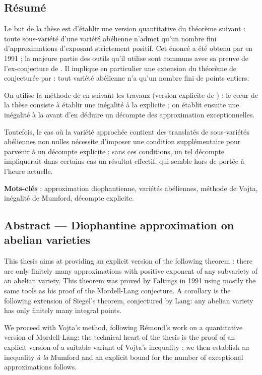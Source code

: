\documentclass[final, cover]{mpg-preth}
\begin{document}
\thispagestyle{empty}

\subsection*{Résumé}

Le but de la thèse est d'établir une version quantitative du théorème suivant
: toute sous-variété d'une variété abélienne n'admet qu'un nombre fini
d'approximations d'exposant strictement positif. Cet énoncé a été obtenu par
 en 1991 ; la majeure partie des outils qu'il utilise sont
communs avec sa preuve de l'ex-conjecture de . Il implique
en particulier une extension du théorème de  conjecturée par
 : tout variété abélienne n'a qu'un nombre fini de points entiers.

On utilise la méthode de  en suivant les travaux 
(version explicite de ) : le cœur de la thèse consiste à
établir une inégalité à la  explicite ; on établit ensuite une
inégalité à la  avant d'en déduire un décompte des approximation
exceptionnelles.

Toutefois, le cas où la variété approchée contient des translatés de
sous-variétés abéliennes non nulles nécessite d'imposer une condition
supplémentaire pour parvenir à un décompte explicite : sans ces conditions,
un tel décompte impliquerait dans certains cas un résultat effectif, qui
semble hors de portée à l'heure actuelle.

\medskip\noindent
\textbf{Mots-clés} : approximation diophantienne, variétés abéliennes, méthode
de Vojta, inégalité de Mumford, décompte explicite.

\subsection*{Abstract --- Diophantine approximation on abelian varieties}

This thesis aims at providing an explicit version of the following theorem :
there are only finitely many approximations with positive exponent of any
subvariety of an abelian variety. This theorem was proved by Faltings in 1991
using mostly the same tools as his proof of the Mordell-Lang conjecture. A
corollary is the following extension of Siegel's theorem, conjectured by Lang:
any abelian variety has only finitely many integral points.

We proceed with Vojta's method, following Rémond's work on a quantitative
version of Mordell-Lang: the technical heart of the thesis is the proof of an
explicit version of a suitable variant of Vojta's inequality ; we then
establish an inequality \emph{à la} Mumford and an explicit bound for the
number of exceptional approximations follows.
\end{document}
